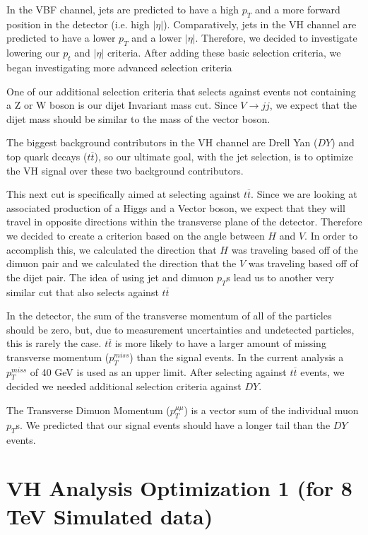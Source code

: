 \documentclass[12pt]{article}
\begin{document}
In the VBF channel, jets are predicted to have a high $p_{T}$ and a more forward position in the detector (i.e. high $|\eta|$). 
Comparatively, jets in the VH channel are predicted to have a lower $p_{T}$ and a lower $|\eta|$. 
Therefore, we decided to investigate lowering our $p_{t}$ and $|\eta|$ criteria. After adding these basic selection criteria,
we began investigating more advanced selection criteria

One of our additional selection criteria that selects against events not containing a Z or W boson is our dijet Invariant mass cut. 
Since $V \rightarrow jj$, we expect that the dijet mass should be similar to the mass of the vector boson. 

The biggest background contributors in the VH channel are Drell Yan ($DY$) and top quark decays ($t\overline{t}$), 
so our ultimate goal, with the jet selection, is to optimize the VH signal over these two background contributors.

This next cut is specifically aimed at selecting against $t\overline{t}$.
Since we are looking at associated production of a Higgs and a Vector boson, we expect that they will 
travel in opposite directions within the transverse plane of the detector. 
Therefore we decided to create a criterion based on the angle between $H$ and $V$. 
In order to accomplish this, we calculated the direction that $H$ was traveling based off of the dimuon pair 
and we calculated the direction that the $V$ was traveling based off of the dijet pair. 
The idea of using jet and dimuon $p_{T}$s lead us to another very similar cut that also selects against $t\overline{t}$ 

In the detector, the sum of the transverse momentum of all of the particles should be zero, 
but, due to measurement uncertainties and undetected particles, this is rarely the case. 
$t\overline{t}$ is more likely to have a larger amount of missing transverse momentum ($p_{T}^{miss}$) than the signal events. 
In the current analysis a $p_{T}^{miss}$ of 40 GeV is used as an upper limit.
After selecting against $t\overline{t}$ events, we decided we needed additional selection criteria against $DY$.

The Transverse Dimuon Momentum ($p_{T}^{\mu \mu}$) is a vector sum of the individual muon $p_{T}$s. 
We predicted that our signal events should have a longer tail than the $DY$ events.

\section{VH Analysis Optimization 1 (for 8 TeV Simulated data)}
\end{document}
